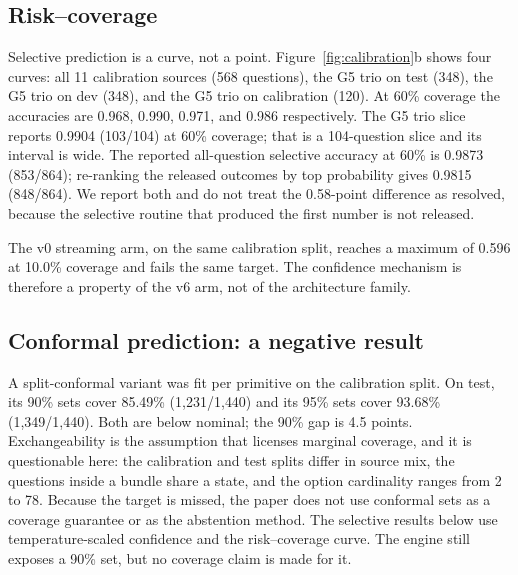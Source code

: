 \subsection{Risk--coverage}
Selective prediction is a curve, not a point. Figure~\ref{fig:calibration}b shows four curves: all 11 calibration sources (568 questions), the G5 trio on test (348), the G5 trio on dev (348), and the G5 trio on calibration (120). At 60\% coverage the accuracies are 0.968, 0.990, 0.971, and 0.986 respectively. The G5 trio slice reports 0.9904 (103/104) at 60\% coverage; that is a 104-question slice and its interval is wide. The reported all-question selective accuracy at 60\% is 0.9873 (853/864); re-ranking the released outcomes by top probability gives 0.9815 (848/864). We report both and do not treat the 0.58-point difference as resolved, because the selective routine that produced the first number is not released.

The v0 streaming arm, on the same calibration split, reaches a maximum of 0.596 at 10.0\% coverage and fails the same target. The confidence mechanism is therefore a property of the v6 arm, not of the architecture family.

\subsection{Conformal prediction: a negative result}
A split-conformal variant was fit per primitive on the calibration split. On test, its 90\% sets cover 85.49\% (1{,}231/1{,}440) and its 95\% sets cover 93.68\% (1{,}349/1{,}440). Both are below nominal; the 90\% gap is 4.5 points. Exchangeability is the assumption that licenses marginal coverage, and it is questionable here: the calibration and test splits differ in source mix, the questions inside a bundle share a state, and the option cardinality ranges from 2 to 78. Because the target is missed, the paper does not use conformal sets as a coverage guarantee or as the abstention method. The selective results below use temperature-scaled confidence and the risk--coverage curve. The engine still exposes a 90\% set, but no coverage claim is made for it.

